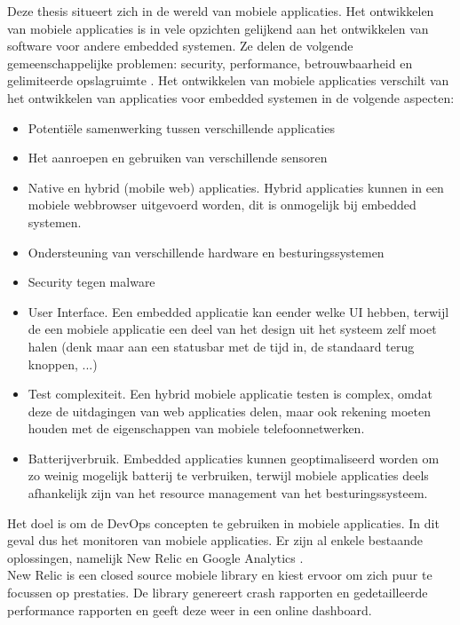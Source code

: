 Deze thesis situeert zich in de wereld van mobiele applicaties. Het ontwikkelen van mobiele applicaties is in vele opzichten gelijkend aan het ontwikkelen van software voor andere embedded systemen. Ze delen de volgende gemeenschappelijke problemen: security, performance, betrouwbaarheid en gelimiteerde opslagruimte \cite{wasserman2010software}. Het ontwikkelen van mobiele applicaties verschilt van het ontwikkelen van applicaties voor embedded systemen in de volgende aspecten:
\begin{itemize}
\item Potenti\"ele samenwerking tussen verschillende applicaties
\item Het aanroepen en gebruiken van verschillende sensoren
\item Native en hybrid (mobile web) applicaties. Hybrid applicaties kunnen in een mobiele webbrowser uitgevoerd worden, dit is onmogelijk bij embedded systemen.
\item Ondersteuning van verschillende hardware en besturingssystemen
\item Security tegen malware
\item User Interface. Een embedded applicatie kan eender welke UI hebben, terwijl de een mobiele applicatie een deel van het design uit het systeem zelf moet halen (denk maar aan een statusbar met de tijd in, de standaard terug knoppen, ...)
\item Test complexiteit. Een hybrid mobiele applicatie testen is complex, omdat deze de uitdagingen van web applicaties delen, maar ook rekening moeten houden met de eigenschappen van mobiele telefoonnetwerken.
\item Batterijverbruik. Embedded applicaties kunnen geoptimaliseerd worden om zo weinig mogelijk batterij te verbruiken, terwijl mobiele applicaties deels afhankelijk zijn van het resource management van het besturingssysteem.
\end{itemize}


Het doel is om de DevOps concepten te gebruiken in mobiele applicaties. In dit geval dus het monitoren van mobiele applicaties. Er zijn al enkele bestaande oplossingen, namelijk New Relic \cite{NewRelic} en Google Analytics \cite{GooAna}. \\ 

New Relic is een closed source mobiele library en kiest ervoor om zich puur te focussen op prestaties. De library genereert crash rapporten en gedetailleerde performance rapporten en geeft deze weer in een online dashboard. \\

